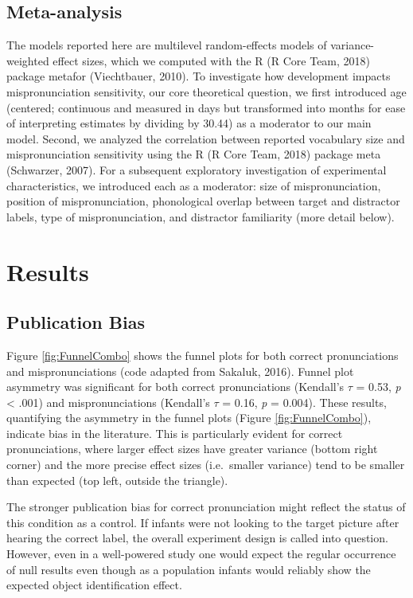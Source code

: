 \documentclass[man]{apa6}
\begin{document}
\hypertarget{meta-analysis}{%
\subsection{Meta-analysis}\label{meta-analysis}}

The models reported here are multilevel random-effects models of variance-weighted effect sizes, which we computed with the R (R Core Team, 2018) package metafor (Viechtbauer, 2010). To investigate how development impacts mispronunciation sensitivity, our core theoretical question, we first introduced age (centered; continuous and measured in days but transformed into months for ease of interpreting estimates by dividing by 30.44) as a moderator to our main model. Second, we analyzed the correlation between reported vocabulary size and mispronunciation sensitivity using the R (R Core Team, 2018) package meta (Schwarzer, 2007). For a subsequent exploratory investigation of experimental characteristics, we introduced each as a moderator: size of mispronunciation, position of mispronunciation, phonological overlap between target and distractor labels, type of mispronunciation, and distractor familiarity (more detail below).

\hypertarget{results}{%
\section{Results}\label{results}}

\hypertarget{publication-bias-1}{%
\subsection{Publication Bias}\label{publication-bias-1}}

Figure \ref{fig:FunnelCombo} shows the funnel plots for both correct pronunciations and mispronunciations (code adapted from Sakaluk, 2016). Funnel plot asymmetry was significant for both correct pronunciations (Kendall's \(\tau\) = 0.53, \emph{p} \textless{} .001) and mispronunciations (Kendall's \(\tau\) = 0.16, \emph{p} = 0.004). These results, quantifying the asymmetry in the funnel plots (Figure \ref{fig:FunnelCombo}), indicate bias in the literature. This is particularly evident for correct pronunciations, where larger effect sizes have greater variance (bottom right corner) and the more precise effect sizes (i.e.~smaller variance) tend to be smaller than expected (top left, outside the triangle).

The stronger publication bias for correct pronunciation might reflect the status of this condition as a control. If infants were not looking to the target picture after hearing the correct label, the overall experiment design is called into question. However, even in a well-powered study one would expect the regular occurrence of null results even though as a population infants would reliably show the expected object identification effect.
\end{document}
